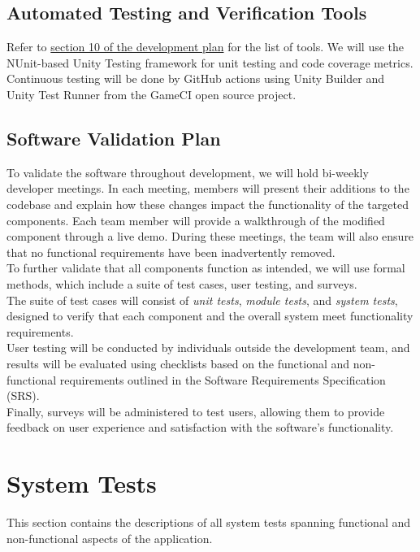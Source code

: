 \documentclass[12pt, titlepage]{article}
\begin{document}
\subsection{Automated Testing and Verification Tools}

Refer to \href{https://github.com/russellrd/realm/blob/main/docs/DevelopmentPlan/DevelopmentPlan.pdf}{section 10 of the development plan} for the list of tools. We will use the NUnit-based Unity Testing framework for unit testing and code coverage metrics. Continuous testing will be done by GitHub actions using Unity Builder and Unity Test Runner from the GameCI open source project.

\subsection{Software Validation Plan}

To validate the software throughout development, we will hold bi-weekly developer meetings. In each meeting, members will present their additions to the codebase and explain how these changes impact the functionality of the targeted components. Each team member will provide a walkthrough of the modified component through a live demo. During these meetings, the team will also ensure that no functional requirements have been inadvertently removed. \\

To further validate that all components function as intended, we will use formal methods, which include a suite of test cases, user testing, and surveys. \\

The suite of test cases will consist of \textit{unit tests}, \textit{module tests}, and \textit{system tests}, designed to verify that each component and the overall system meet functionality requirements. \\

User testing will be conducted by individuals outside the development team, and results will be evaluated using checklists based on the functional and non-functional requirements outlined in the Software Requirements Specification (SRS). \\

Finally, surveys will be administered to test users, allowing them to provide feedback on user experience and satisfaction with the software's functionality. \\

\section{System Tests}
This section contains the descriptions of all system tests spanning functional and non-functional aspects of the application.
\end{document}
